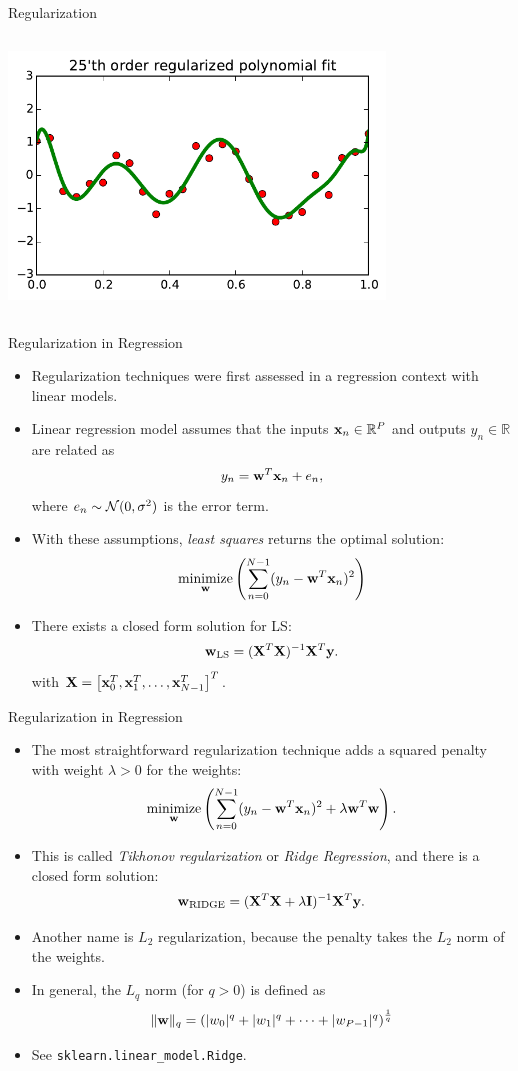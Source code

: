 \documentclass[10pt, aspectratio=169]{beamer} %
\DeclareMathOperator*{\minimize}{minimize} %
\newcommand{\R}{{\mathbb{R}}}
\newcommand{\w}{{\bf w}}
\newcommand{\X}{{\bf X}}
\newcommand{\x}{{\bf x}}
\newcommand{\y}{{\bf y}}
\newcommand{\leveys}{0.75\textwidth}
\begin{document}
\begin{frame}{Regularization}
\begin{columns}
\includegraphics[width=\leveys]{timeSeries_25_reg.pdf}
\end{columns}
\end{frame}

\begin{frame}[fragile]{Regularization in Regression}
\begin{itemize}
\item Regularization techniques were first assessed in a regression context with linear models.
\item Linear regression model assumes that the inputs $\x_n\in \R^{P}$ and outputs $y_n\in \R$ 
are related as
\[
y_n = \w^T\x_n + e_n,
\]
where $e_n\sim {\cal N}(0, \sigma^2)$ is the error term.
\item With these assumptions, \emph{least squares} returns the optimal solution:
\[
\minimize_{\w}\left( \sum_{n = 0}^{N-1} (y_n - \w^T\x_n)^2 \right)
\]
\item There exists a closed form solution for LS:
\[
\w_{\text{LS}} = (\X^T\X)^{-1}\X^T\y.
\]
with $\X = \left[\x_0^T,\x_1^T,\ldots,\x_{N-1}^T\right]^T$.
\end{itemize}
\end{frame}

\begin{frame}[fragile]{Regularization in Regression}
\begin{itemize}
\item The most straightforward regularization technique adds a squared penalty with weight $\lambda>0$ for the weights:
\[
\minimize_{\w}\left( \sum_{n = 0}^{N-1} (y_n - \w^T\x_n)^2 + \lambda\w^T\w\right).
\]
\item This is called \emph{Tikhonov regularization} or \emph{Ridge Regression}, and there is a closed form solution:
\[
\w_{\text{RIDGE}} = (\X^T\X + \lambda{\bf I})^{-1}\X^T\y.
\]
\item Another name is $L_2$ regularization, because the penalty takes the $L_2$ norm of the weights.
\item In general, the $L_q$ norm (for $q>0$) is defined as 
\[
\|\w\|_q = \left( |w_0|^q +|w_1|^q + \cdots + |w_{P-1}|^{q} \right)^{\frac1q}
\]
\item See \verb+sklearn.linear_model.Ridge+.
\end{itemize}
\end{frame}
\end{document}
